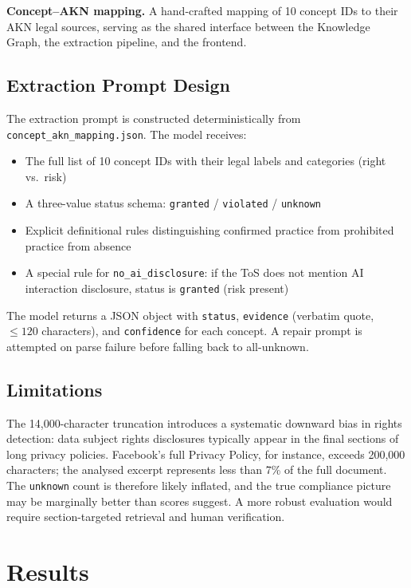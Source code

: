 \documentclass[12pt, a4paper]{article}
\begin{document}
\textbf{Concept--AKN mapping.} A hand-crafted mapping of 10 concept IDs to their AKN legal sources, serving as the shared interface between the Knowledge Graph, the extraction pipeline, and the frontend.

\subsection{Extraction Prompt Design}

The extraction prompt is constructed deterministically from \texttt{concept\_akn\_mapping.json}. The model receives:
\begin{itemize}[noitemsep]
  \item The full list of 10 concept IDs with their legal labels and categories (right vs.\ risk)
  \item A three-value status schema: \texttt{granted} / \texttt{violated} / \texttt{unknown}
  \item Explicit definitional rules distinguishing confirmed practice from prohibited practice from absence
  \item A special rule for \texttt{no\_ai\_disclosure}: if the ToS does not mention AI interaction disclosure, status is \texttt{granted} (risk present)
\end{itemize}

The model returns a JSON object with \texttt{status}, \texttt{evidence} (verbatim quote, $\leq 120$ characters), and \texttt{confidence} for each concept. A repair prompt is attempted on parse failure before falling back to all-unknown.

\subsection{Limitations}

The 14,000-character truncation introduces a systematic downward bias in rights detection: data subject rights disclosures typically appear in the final sections of long privacy policies. Facebook's full Privacy Policy, for instance, exceeds 200,000 characters; the analysed excerpt represents less than 7\% of the full document. The \texttt{unknown} count is therefore likely inflated, and the true compliance picture may be marginally better than scores suggest. A more robust evaluation would require section-targeted retrieval and human verification.

\section{Results}
\end{document}
